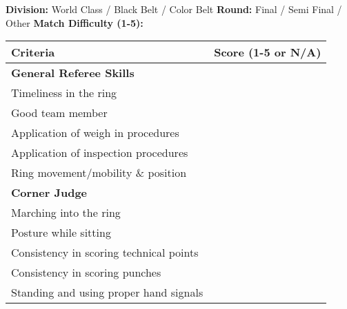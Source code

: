 \documentclass[10pt]{article}
\begin{document}
\begin{center}
    \textbf{Division:} World Class / Black Belt / Color Belt 
    \hfill \textbf{Round:} Final / Semi Final / Other
    \hfill \textbf{Match Difficulty (1-5):} \underline{\hspace{0.05\textwidth}}

    \vspace{0.02\textwidth}


    \begin{tabular}{|M{0.85\textwidth}|C{0.10\textwidth}|}
        \hline
        \textbf{\Large Criteria} & \textbf{Score (1-5 or N/A)} \\ \hline
        \textbf{General Referee Skills} &  \\ \hline
        Timeliness in the ring & \\ \hline
        Good team member & \\ \hline
        Application of weigh in procedures & \\ \hline
        Application of inspection procedures & \\ \hline
        Ring movement/mobility \& position & \\ \hline
        
        \textbf{Corner Judge} &  \\ \hline
        Marching into the ring & \\ \hline
        Posture while sitting & \\ \hline
        Consistency in scoring technical points & \\ \hline
        Consistency in scoring punches & \\ \hline
        Standing and using proper hand signals & \\ \hline


\end{tabular}
\end{center}
\end{document}
